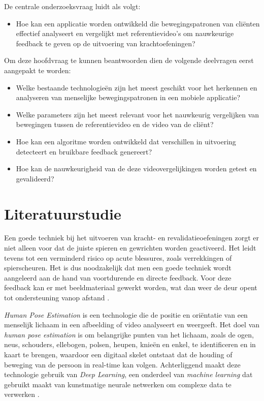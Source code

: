 De centrale onderzoeksvraag luidt als volgt:

\begin{itemize}
  \item Hoe kan een applicatie worden ontwikkeld die bewegingspatronen van cliënten effectief analyseert en vergelijkt met referentievideo’s om nauwkeurige feedback te geven op de uitvoering van krachtoefeningen?
\end{itemize}

Om deze hoofdvraag te kunnen beantwoorden dien de volgende deelvragen eerst aangepakt te worden:

\begin{itemize}
  \item Welke bestaande technologieën zijn het meest geschikt voor het herkennen en analyseren van menselijke bewegingspatronen in een mobiele applicatie?
  \item Welke parameters zijn het meest relevant voor het nauwkeurig vergelijken van bewegingen tussen de referentievideo en de video van de cliënt?
  \item Hoe kan een algoritme worden ontwikkeld dat verschillen in uitvoering detecteert en bruikbare feedback genereert?
  \item Hoe kan de nauwkeurigheid van de deze videovergelijkingen worden getest en gevalideerd?
\end{itemize}


\section{Literatuurstudie}%
\label{sec:literatuurstudie}


Een goede techniek bij het uitvoeren van kracht- en revalidatieoefeningen zorgt er niet alleen voor dat de juiste spieren en gewrichten worden geactiveerd. Het leidt tevens tot een verminderd risico op acute blessures, zoals verrekkingen of spierscheuren. Het is dus noodzakelijk dat men een goede techniek wordt aangeleerd aan de hand van voortdurende en directe feedback. Voor deze feedback kan er met beeldmateriaal gewerkt worden, wat dan weer de deur opent tot ondersteuning vanop afstand \autocite{MyerEtAl2009}.

\emph{Human Pose Estimation} is een technologie die de positie en oriëntatie van een menselijk lichaam in een afbeelding of video analyseert en weergeeft. Het doel van \emph{human pose estimation} is om belangrijke punten van het lichaam, zoals de ogen, neus, schouders, ellebogen, polsen, heupen, knieën en enkel, te identificeren en in kaart te brengen, waardoor een digitaal skelet ontstaat dat de houding of beweging van de persoon in real-time kan volgen. Achterliggend maakt deze technologie gebruik van \emph{Deep Learning}, een onderdeel van \emph{machine learning} dat gebruikt maakt van kunstmatige neurale netwerken om complexe data te verwerken \autocite{JosyulaEtAl2021}.

